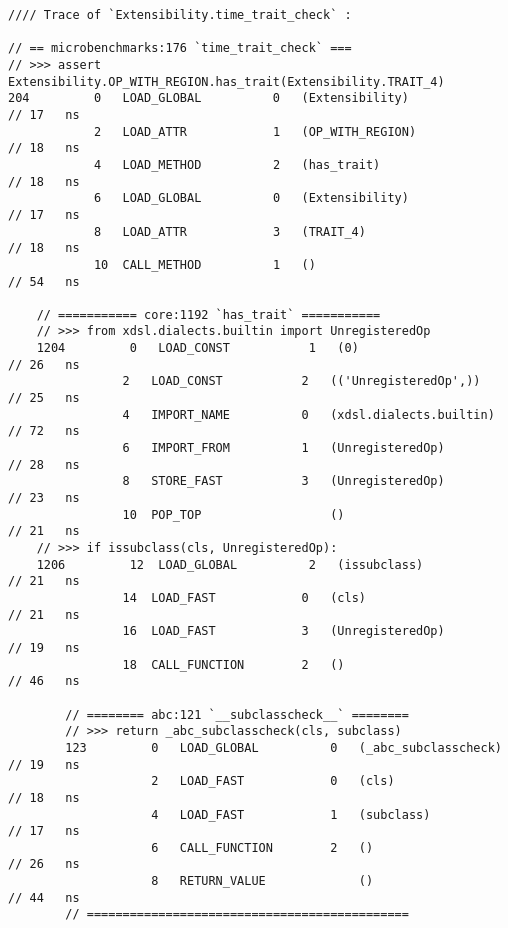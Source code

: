 \begin{code}
    \begin{verbatim}
//// Trace of `Extensibility.time_trait_check` :

// == microbenchmarks:176 `time_trait_check` ===
// >>> assert Extensibility.OP_WITH_REGION.has_trait(Extensibility.TRAIT_4)
204         0   LOAD_GLOBAL          0   (Extensibility)                                    // 17   ns
            2   LOAD_ATTR            1   (OP_WITH_REGION)                                   // 18   ns
            4   LOAD_METHOD          2   (has_trait)                                        // 18   ns
            6   LOAD_GLOBAL          0   (Extensibility)                                    // 17   ns
            8   LOAD_ATTR            3   (TRAIT_4)                                          // 18   ns
            10  CALL_METHOD          1   ()                                                 // 54   ns

    // =========== core:1192 `has_trait` ===========
    // >>> from xdsl.dialects.builtin import UnregisteredOp
    1204         0   LOAD_CONST           1   (0)                                           // 26   ns
                2   LOAD_CONST           2   (('UnregisteredOp',))                          // 25   ns
                4   IMPORT_NAME          0   (xdsl.dialects.builtin)                        // 72   ns
                6   IMPORT_FROM          1   (UnregisteredOp)                               // 28   ns
                8   STORE_FAST           3   (UnregisteredOp)                               // 23   ns
                10  POP_TOP                  ()                                             // 21   ns
    // >>> if issubclass(cls, UnregisteredOp):
    1206         12  LOAD_GLOBAL          2   (issubclass)                                  // 21   ns
                14  LOAD_FAST            0   (cls)                                          // 21   ns
                16  LOAD_FAST            3   (UnregisteredOp)                               // 19   ns
                18  CALL_FUNCTION        2   ()                                             // 46   ns

        // ======== abc:121 `__subclasscheck__` ========
        // >>> return _abc_subclasscheck(cls, subclass)
        123         0   LOAD_GLOBAL          0   (_abc_subclasscheck)                       // 19   ns
                    2   LOAD_FAST            0   (cls)                                      // 18   ns
                    4   LOAD_FAST            1   (subclass)                                 // 17   ns
                    6   CALL_FUNCTION        2   ()                                         // 26   ns
                    8   RETURN_VALUE             ()                                         // 44   ns
        // =============================================


\end{verbatim}
\end{code}

